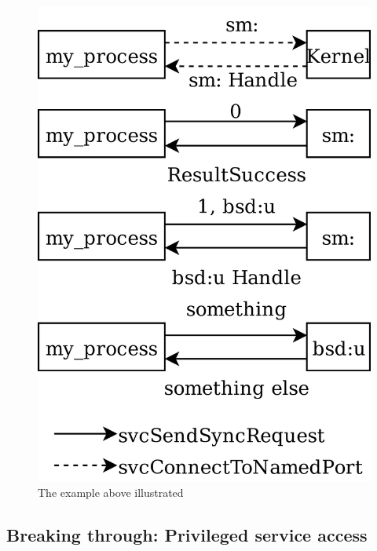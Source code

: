 \documentclass[journal]{IEEEtran}
\begin{document}
\begin{figure}[ht]
  \includegraphics[width=\columnwidth]{services}
    \caption{The example above illustrated}
\end{figure}

\subsection{Breaking through: Privileged service access}
\end{document}
